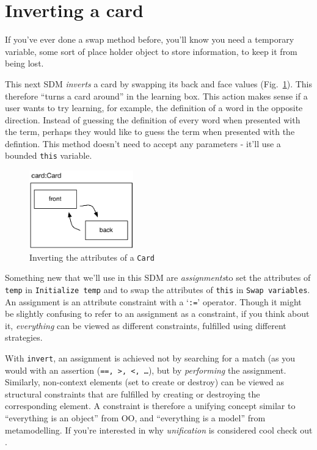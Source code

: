 \newpage
\section{Inverting a card}
\genHeader
\hypertarget{sec:invertCard}{}

If you've ever done a swap method before, you'll know you need a temporary variable, some sort of place holder object to store information, to keep it from
being lost.

This next SDM \emph{inverts} a card by swapping its back and face values (Fig.~\ref{fig:goal_invert}). This therefore ``turns a card around'' in the learning
box. This action makes sense if a user wants to try learning, for example, the definition of a word in the opposite direction. Instead of guessing the
definition of every word when presented with the term, perhaps they would like to guess the term when presented with the defintion. This method doesn't need to
accept any parameters - it'll use a bounded \texttt{this} variable.

\vspace{0.5cm}

\begin{figure}[htbp]
	\centering
    \includegraphics[width=0.4\textwidth]{goal_invert.pdf}
 	\caption{Inverting the attributes of a \texttt{Card}}
 	\label{fig:goal_invert}
\end{figure}
\FloatBarrier

Something new that we'll use in this SDM are \emph{assignments}to set the attributes of \texttt{temp} in \texttt{Initialize temp} and to
swap the attributes of \texttt{this} in \texttt{Swap variables}. An assignment is an attribute constraint with a `\texttt{:=}' operator. Though it might be
slightly confusing to refer to an assignment as a constraint, if you think about it, \emph{everything} can be viewed as different constraints, fulfilled using
different strategies. 

With \texttt{invert}, an assignment is achieved not by searching for a match (as you would with an assertion (\texttt{==, >, <, \ldots}), but
by \emph{performing} the assignment. Similarly, non-context elements (set to create or destroy) can be viewed as structural constraints that are fulfilled by
creating or destroying the corresponding element.  A constraint is therefore a unifying concept similar to ``everything is an object'' from OO, and ``everything
is a model'' from metamodelling.  If you're interested in why \emph{unification} is considered cool check out \cite{BEZ05}.

